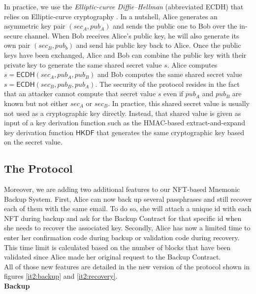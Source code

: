 \documentclass[runningheads]{llncs}
\newcommand{\ms}[1]{\ensuremath{\mathsf{#1}}}
\begin{document}
In practice, we use the {\em Elliptic-curve Diffie–Hellman} (abbreviated ECDH) that relies on Elliptic-curve cryptography \cite{bernstein2006curve25519}. In a nutshell, Alice generates an asymmetric key pair $(sec_A, pub_A)$ and sends the public one to Bob over the in-secure channel. When Bob receives Alice's public key, he will also generate its own pair $(sec_B, pub_b)$ and send his public key back to Alice. Once the public keys have been exchanged, Alice and Bob can combine the public key with their private key to generate the same shared secret value $s$. Alice computes $s=\ms{ECDH}(sec_A, pub_A, pub_B)$ and Bob computes the same shared secret value $s=\ms{ECDH}(sec_B, pub_B, pub_A)$. The security of the protocol resides in the fact that an attacker cannot compute that secret value $s$ even if $pub_A$ and $pub_B$ are known but not either $sec_A$ or $sec_B$. In practice, this shared secret value is usually not used as a cryptographic key directly. Instead, that shared value is given as input of a key derivation function such as the HMAC-based extract-and-expand key derivation function $\ms{HKDF}$ \cite{krawczyk2010hmac} that generates the same cryptographic key based on the secret value. 

\subsection{The Protocol}

Moreover, we are adding two additional features to our NFT-based Mnemonic Backup System. First, Alice can now back up several passphrases and still recover each of them with the same email. To do so, she will attach a unique id with each NFT during backup and ask for the Backup Contract for that specific id when she needs to recover the associated key. Secondly, Alice has now a limited time to enter her confirmation code during backup or validation code during recovery. This time limit is calculated based on the number of blocks that have been validated since Alice made her original request to the Backup Contract. \\

All of those new features are detailed in the new version of the protocol shown in figures \ref{it2:backup} and \ref{it2:recovery}. \\

{\bf Backup}
\end{document}
